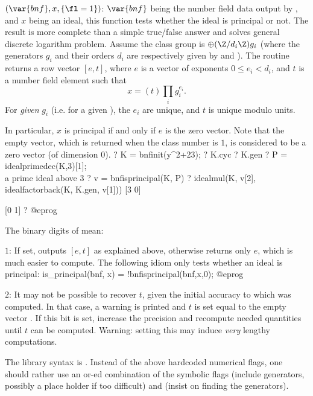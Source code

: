 $(\var{bnf},x,\{\fl=1\})$: \label{se:bnfisprincipal}$\var{bnf}$ being the 
number field data output by , and $x$ being an ideal, this
function tests whether the ideal is principal or not. The result is more
complete than a simple true/false answer and solves general discrete
logarithm problem. Assume the class group is $\oplus (\Z/d_i\Z)g_i$
(where the generators $g_i$ and their orders $d_i$ are respectively given by
 and ). The routine returns a row vector $[e,t]$,
where $e$ is a vector of exponents $0 \leq e_i < d_i$, and $t$ is a number
field element such that
$$ x = (t) \prod_i  g_i^{e_i}.$$
For \emph{given} $g_i$ (i.e. for a given ), the $e_i$ are unique,
and $t$ is unique modulo units.

In particular, $x$ is principal if and only if $e$ is the zero vector. Note
that the empty vector, which is returned when the class number is $1$, is
considered to be a zero vector (of dimension $0$).
\bprog
? K = bnfinit(y^2+23);
? K.cyc
? K.gen
? P = idealprimedec(K,3)[1]; \\ a prime ideal above 3
? v = bnfisprincipal(K, P)
? idealmul(K, v[2], idealfactorback(K, K.gen, v[1]))
[3 0]

[0 1]
? %
@eprog

\noindent The binary digits of \fl mean:

\item $1$: If set, outputs $[e,t]$ as explained above, otherwise returns
only $e$, which is much easier to compute. The following idiom only tests
whether an ideal is principal:
\bprog
  is_principal(bnf, x) = !bnfisprincipal(bnf,x,0);
@eprog

\item $2$: It may not be possible to recover $t$, given the initial accuracy
to which  was computed. In that case, a warning is printed and $t$ is
set equal to the empty vector \kbd{[]\til}. If this bit is set,
increase the precision and recompute needed quantities until $t$ can be
computed. Warning: setting this may induce \emph{very} lengthy computations.

The library syntax is .
Instead of the above hardcoded numerical flags, one should
rather use an or-ed combination of the symbolic flags  (include
generators, possibly a place holder if too difficult) and 
(insist on finding the generators).

